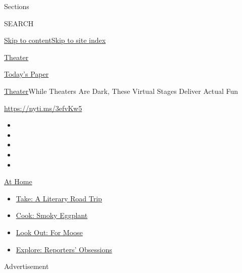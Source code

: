 Sections

SEARCH

\protect\hyperlink{site-content}{Skip to
content}\protect\hyperlink{site-index}{Skip to site index}

\href{https://www.nytimes.com/section/theater}{Theater}

\href{https://myaccount.nytimes.com/auth/login?response_type=cookie\&client_id=vi}{}

\href{https://www.nytimes.com/section/todayspaper}{Today's Paper}

\href{/section/theater}{Theater}\textbar{}While Theaters Are Dark, These
Virtual Stages Deliver Actual Fun

\url{https://nyti.ms/3efvKw5}

\begin{itemize}
\item
\item
\item
\item
\item
\end{itemize}

\href{https://www.nytimes.com/spotlight/at-home?action=click\&pgtype=Article\&state=default\&region=TOP_BANNER\&context=at_home_menu}{At
Home}

\begin{itemize}
\tightlist
\item
  \href{https://www.nytimes.com/2020/07/28/books/time-for-a-literary-road-trip.html?action=click\&pgtype=Article\&state=default\&region=TOP_BANNER\&context=at_home_menu}{Take:
  A Literary Road Trip}
\item
  \href{https://www.nytimes.com/2020/07/29/magazine/bored-with-your-home-cooking-some-smoky-eggplant-will-fix-that.html?action=click\&pgtype=Article\&state=default\&region=TOP_BANNER\&context=at_home_menu}{Cook:
  Smoky Eggplant}
\item
  \href{https://www.nytimes.com/2020/07/27/travel/moose-michigan-isle-royale.html?action=click\&pgtype=Article\&state=default\&region=TOP_BANNER\&context=at_home_menu}{Look
  Out: For Moose}
\item
  \href{https://www.nytimes.com/interactive/2020/at-home/even-more-reporters-editors-diaries-lists-recommendations.html?action=click\&pgtype=Article\&state=default\&region=TOP_BANNER\&context=at_home_menu}{Explore:
  Reporters' Obsessions}
\end{itemize}

Advertisement

